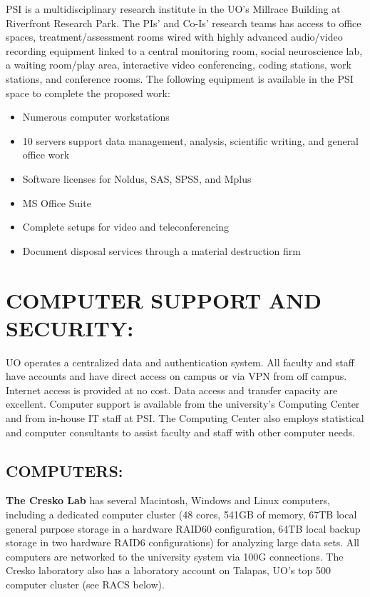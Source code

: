 \documentclass[
]{book}
\providecommand{\tightlist}{%
  \setlength{\itemsep}{0pt}\setlength{\parskip}{0pt}}
\begin{document}
PSI is a multidisciplinary research institute in the UO's Millrace Building at Riverfront Research Park. The PIs' and Co-Is' research teams has access to office spaces, treatment/assessment rooms wired with highly advanced audio/video recording equipment linked to a central monitoring room, social neuroscience lab, a waiting room/play area, interactive video conferencing, coding stations, work stations, and conference rooms. The following equipment is available in the PSI space to complete the proposed work:

\begin{itemize}
\tightlist
\item
  Numerous computer workstations
\item
  10 servers support data management, analysis, scientific writing, and general office work
\item
  Software licenses for Noldus, SAS, SPSS, and Mplus
\item
  MS Office Suite
\item
  Complete setups for video and teleconferencing
\item
  Document disposal services through a material destruction firm
\end{itemize}

\hypertarget{computer-support-and-security}{%
\section{COMPUTER SUPPORT AND SECURITY:}\label{computer-support-and-security}}

UO operates a centralized data and authentication system. All faculty and staff have accounts and have direct access on campus or via VPN from off campus. Internet access is provided at no cost. Data access and transfer capacity are excellent. Computer support is available from the university's Computing Center and from in-house IT staff at PSI. The Computing Center also employs statistical and computer consultants to assist faculty and staff with other computer needs.

\hypertarget{computers}{%
\subsection{COMPUTERS:}\label{computers}}

\textbf{The Cresko Lab} has several Macintosh, Windows and Linux computers, including a dedicated computer cluster (48 cores, 541GB of memory, 67TB local general purpose storage in a hardware RAID60 configuration, 64TB local backup storage in two hardware RAID6 configurations) for analyzing large data sets. All computers are networked to the university system via 100G connections. The Cresko laboratory also has a laboratory account on Talapas, UO's top 500 computer cluster (see RACS below).
\end{document}

